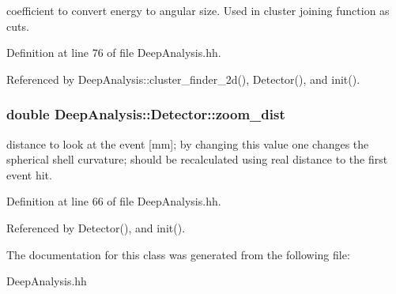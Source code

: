 coefficient to convert energy to angular size. Used in cluster joining function as cuts. 

Definition at line 76 of file DeepAnalysis.hh.

Referenced by DeepAnalysis::cluster\_\-finder\_\-2d(), Detector(), and init().
\subsubsection[{zoom\_\-dist}]{\setlength{\rightskip}{0pt plus 5cm}double {\bf DeepAnalysis::Detector::zoom\_\-dist}}\label{classDeepAnalysis_1_1Detector_a33227b51d64d96fdaba6c0c52e6caa5e}


distance to look at the event [mm]; by changing this value one changes the spherical shell curvature; should be recalculated using real distance to the first event hit. 

Definition at line 66 of file DeepAnalysis.hh.

Referenced by Detector(), and init().

The documentation for this class was generated from the following file:\begin{DoxyCompactItemize}
\item 
DeepAnalysis.hh\end{DoxyCompactItemize}
